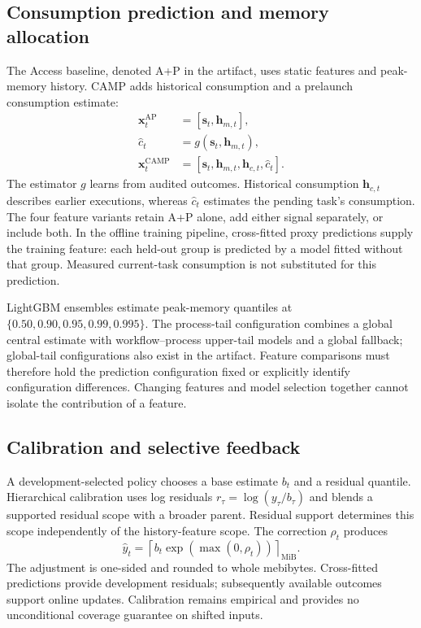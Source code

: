 \subsection{Consumption prediction and memory allocation}
\label{sec:consumption}
The Access baseline, denoted A+P in the artifact, uses static features and
peak-memory history. CAMP adds historical consumption and a prelaunch
consumption estimate:
\begin{align}
\mathbf{x}^{\mathrm{AP}}_t &= [\mathbf{s}_t,\mathbf{h}_{m,t}],\\
\hat c_t &= g(\mathbf{s}_t,\mathbf{h}_{m,t}),\label{eq:proxy}\\
\mathbf{x}^{\mathrm{CAMP}}_t
  &= [\mathbf{s}_t,\mathbf{h}_{m,t},\mathbf{h}_{c,t},\hat c_t].
\end{align}
The estimator $g$ learns from audited outcomes. Historical consumption
$\mathbf{h}_{c,t}$ describes earlier executions, whereas $\hat c_t$ estimates
the pending task's consumption. The four feature variants retain A+P
alone, add either signal separately, or include both. In the offline
training pipeline, cross-fitted proxy predictions supply the training
feature: each held-out group is predicted by a model fitted without that
group. Measured current-task consumption is not substituted for this
prediction.

\label{sec:quantiles}
LightGBM ensembles estimate peak-memory quantiles at
$\{0.50,0.90,0.95,0.99,0.995\}$. The process-tail configuration combines a
global central estimate with workflow--process upper-tail models and a
global fallback; global-tail configurations also exist in the artifact.
Feature comparisons must therefore hold the prediction configuration
fixed or explicitly identify configuration differences. Changing features
and model selection together cannot isolate the contribution of a feature.

\subsection{Calibration and selective feedback}
\label{sec:calibration}
A development-selected policy chooses a base estimate $b_t$ and a residual
quantile. Hierarchical calibration uses log residuals
$r_\tau=\log(y_\tau/b_\tau)$ and blends a supported residual scope with a
broader parent. Residual support determines this scope independently of
the history-feature scope. The correction $\rho_t$ produces
\begin{equation}
\hat y_t=\left\lceil b_t\exp\!\left(\max(0,\rho_t)\right)\right\rceil_{\mathrm{MiB}}.
\label{eq:final}
\end{equation}
The adjustment is one-sided and rounded to whole mebibytes. Cross-fitted
predictions provide development residuals; subsequently available outcomes
support online updates. Calibration remains empirical and provides no
unconditional coverage guarantee on shifted inputs.

